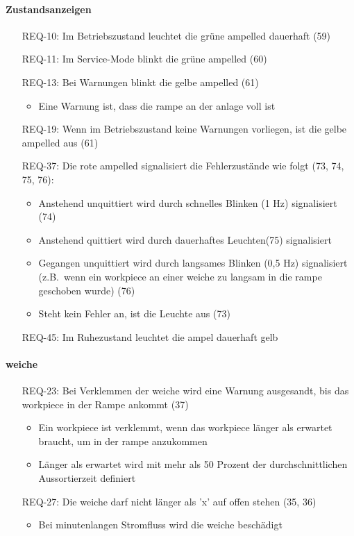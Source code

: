 \paragraph{Zustandsanzeigen}
\begin{itemize}
    \item[REQ-10:] Im Betriebszustand leuchtet die grüne \gls{ampelled} dauerhaft (59)
    \item[REQ-11:] Im Service-Mode blinkt die grüne \gls{ampelled}  (60)
    \item[REQ-13:] Bei Warnungen blinkt die gelbe \gls{ampelled} (61)
    \begin{itemize}
        \item Eine Warnung ist, dass die \gls{rampe} an der \gls{anlage} voll ist
    \end{itemize}
    \item[REQ-19:] Wenn im Betriebszustand keine Warnungen vorliegen, ist die gelbe \gls{ampelled} aus (61)
    \item[REQ-37:] Die rote \gls{ampelled} signalisiert die Fehlerzustände wie folgt (73, 74, 75, 76):
    \begin{itemize}
        \item Anstehend unquittiert wird durch schnelles Blinken (1 Hz) signalisiert (74)
        \item Anstehend quittiert wird durch dauerhaftes Leuchten(75) signalisiert
        \item Gegangen unquittiert wird durch langsames Blinken (0,5 Hz) signalisiert (z.B.\ wenn ein
        \gls{workpiece} an einer \gls{weiche} zu langsam in die \gls{rampe} geschoben wurde) (76)
        \item Steht kein Fehler an, ist die Leuchte aus (73)
    \end{itemize}
    \item[REQ-45:] Im Ruhezustand leuchtet die \gls{ampel} dauerhaft gelb
\end{itemize}

\paragraph{\gls{weiche}}
\begin{itemize}
    \item[REQ-23:] Bei Verklemmen der \gls{weiche} wird eine Warnung ausgesandt, bis das \gls{workpiece} in der Rampe ankommt (37)
    \begin{itemize}
        \item Ein \gls{workpiece} ist verklemmt, wenn das \gls{workpiece} länger als erwartet braucht, um in der \gls{rampe} anzukommen
        \item Länger als erwartet wird mit mehr als 50 Prozent der durchschnittlichen Aussortierzeit definiert
    \end{itemize}
    \item[REQ-27:] Die \gls{weiche} darf nicht länger als 'x' auf offen stehen (35, 36) %
    \begin{itemize}
        \item Bei minutenlangen Stromfluss wird die \gls{weiche} beschädigt
    \end{itemize}
\end{itemize}

